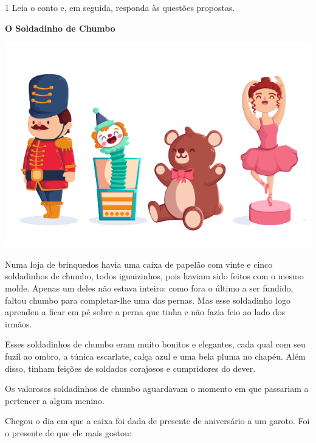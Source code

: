 \begin{conteudo}
\begin{conteudo}
\begin{conteudo}
\begin{conteudo}
\begin{conteudo}
\num{1} Leia o conto e, em seguida, responda às questões propostas.


\begin{myquote}
\textbf{O Soldadinho de Chumbo}


\begin{center}
\includegraphics[width=\textwidth]{media/image24a.png}
\end{center}


Numa loja de brinquedos havia uma caixa de papelão com vinte e cinco
soldadinhos de chumbo, todos iguaizinhos, pois haviam sido feitos com o
mesmo molde. Apenas um deles não estava inteiro: como fora o último a ser
fundido, faltou chumbo para completar-lhe uma das pernas. Mas esse soldadinho
logo aprendeu a ficar em pé sobre a perna que tinha e não fazia feio
ao lado dos irmãos.

Esses soldadinhos de chumbo eram muito bonitos e elegantes, cada qual
com seu fuzil ao ombro, a túnica escarlate, calça azul e uma bela pluma
no chapéu. Além disso, tinham feições de soldados corajosos e
cumpridores do dever.

Os valorosos soldadinhos de chumbo aguardavam o momento em que passariam
a pertencer a algum menino.

Chegou o dia em que a caixa foi dada de presente de aniversário a um
garoto. Foi o presente de que ele mais gostou:


\end{myquote}
\end{conteudo}
\end{conteudo}
\end{conteudo}
\end{conteudo}
\end{conteudo}
